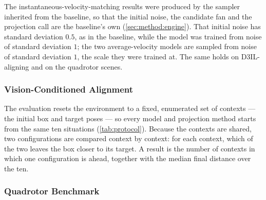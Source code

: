 The instantaneous-velocity-matching results were produced by the sampler inherited from the baseline, so
that the initial noise, the candidate fan and the projection call are the baseline's own
(\autoref{sec:method:engine}). That initial noise has standard deviation $0.5$, as in the baseline,
while the model was trained from noise of standard deviation $1$; the two average-velocity models are
sampled from noise of standard deviation $1$, the scale they were trained at. The same holds on
D3IL-aligning and on the quadrotor scenes.

\subsubsection{Vision-Conditioned Alignment}\label{sec:setup:protocol:aligning}

The evaluation resets the environment to a fixed, enumerated set of contexts --- the initial box and target
poses --- so every model and projection method starts from the same ten situations
(\autoref{tab:protocol}). Because the contexts are shared, two configurations are compared context by
context: for each context, which of the two leaves the box closer to its target. A result is the number of
contexts in which one configuration is ahead, together with the median final distance over the ten.

\subsubsection{Quadrotor Benchmark}\label{sec:setup:protocol:uav}

